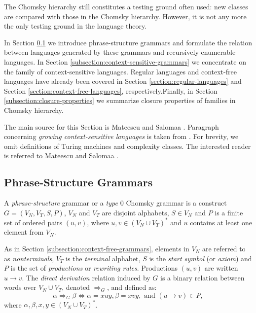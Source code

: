 The Chomsky hierarchy still constitutes a testing ground often used: new classes are compared with those in the Chomsky hierarchy. However, it is not any more the only testing ground in the language theory.

In Section \ref{subsection:phrase-structure-grammars} we introduce phrase-structure grammars and formulate the relation between languages generated by these grammars and  recursively enumerable languages. In Section \ref{subsection:context-sensitive-grammars} we concentrate on the family of context-sensitive languages. Regular languages and context-free languages have already been covered in Section \ref{section:regular-languages} and Section \ref{section:context-free-languages}, respectively.Finally, in Section \ref{subsection:closure-properties} we summarize closure properties of families in Chomsky hierarchy.


The main source for this Section is Mateescu and Salomaa \cite{MaSa1997formal, MaSa1997aspects}. Paragraph concerning \emph{growing context-sensitive 
languages} is taken from \cite{BO98}. For brevity, we omit definitions of Turing machines and complexity classes. The interested reader is referred to Mateescu and Salomaa \cite{MaSa1997aspects}.

\subsection{Phrase-Structure Grammars}
\label{subsection:phrase-structure-grammars}

A \emph{phrase-structure} grammar or a \emph{type $0$} Chomsky grammar is a construct $G = (V_N, V_T, S, P)$, $V_N$ and $V_T$ are disjoint alphabets, $S \in V_N$ and $P$ is a finite set of ordered pairs $(u, v)$, where $u, v \in (V_N \cup V_T)^*$ and $u$ contains at least one element from $V_N$.

As in Section \ref{subsection:context-free-grammars}, elements in $V_N$ are referred to as \emph{nonterminals}, $V_T$ is the  \emph{terminal} alphabet, $S$ is the \emph{start symbol} (or \emph{axiom}) and $P$ is the set of  \emph{productions} or \emph{rewriting rules}. Productions $(u, v)$ are written $u \to v$. The \emph{direct derivation} relation induced by $G$ is a binary relation between words over $V_N \cup V_T$, denoted $\Rightarrow_G$, and defined as: $$\alpha \Rightarrow_G \beta \Leftrightarrow \alpha = xuy, \beta = xvy, \text{ and } (u \to v) \in P,$$ where $\alpha, \beta, x, y \in (V_N \cup V_T)^*$.

